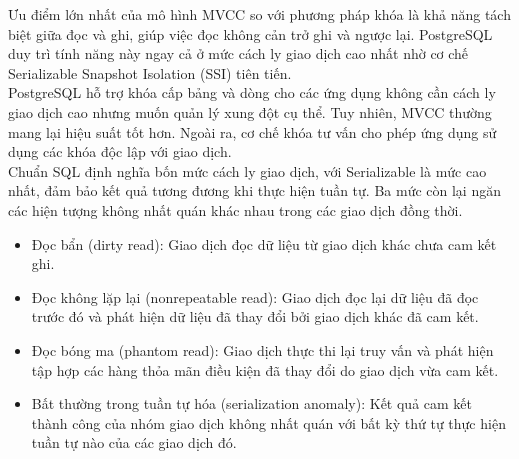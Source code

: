 Ưu điểm lớn nhất của mô hình MVCC so với phương pháp khóa là khả năng tách biệt giữa đọc và ghi, giúp việc đọc không cản trở ghi và ngược lại. PostgreSQL duy trì tính năng này ngay cả ở mức cách ly giao dịch cao nhất nhờ cơ chế Serializable Snapshot Isolation (SSI) tiên tiến.\\

PostgreSQL hỗ trợ khóa cấp bảng và dòng cho các ứng dụng không cần cách ly giao dịch cao nhưng muốn quản lý xung đột cụ thể. Tuy nhiên, MVCC thường mang lại hiệu suất tốt hơn. Ngoài ra, cơ chế khóa tư vấn cho phép ứng dụng sử dụng các khóa độc lập với giao dịch.\\

Chuẩn SQL định nghĩa bốn mức cách ly giao dịch, với Serializable là mức cao nhất, đảm bảo kết quả tương đương khi thực hiện tuần tự. Ba mức còn lại ngăn các hiện tượng không nhất quán khác nhau trong các giao dịch đồng thời.
\begin{itemize}
    \item Đọc bẩn (dirty read): Giao dịch đọc dữ liệu từ giao dịch khác chưa cam kết ghi.
    \item Đọc không lặp lại (nonrepeatable read): Giao dịch đọc lại dữ liệu đã đọc trước đó và phát hiện dữ liệu đã thay đổi bởi giao dịch khác đã cam kết.
    \item Đọc bóng ma (phantom read): Giao dịch thực thi lại truy vấn và phát hiện tập hợp các hàng thỏa mãn điều kiện đã thay đổi do giao dịch vừa cam kết.
    \item Bất thường trong tuần tự hóa (serialization anomaly): Kết quả cam kết thành công của nhóm giao dịch không nhất quán với bất kỳ thứ tự thực hiện tuần tự nào của các giao dịch đó.
\end{itemize}
